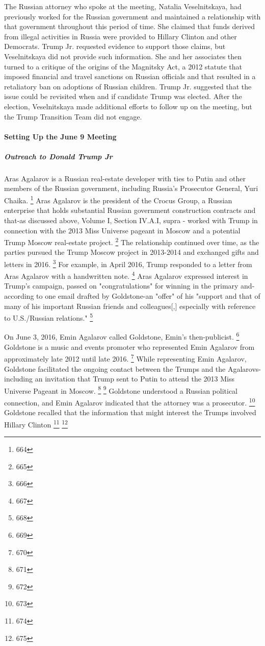 The Russian attorney who spoke at the meeting, Natalia Veselnitskaya, had previously worked for the Russian government and maintained a relationship with that government throughout this period of time.
She claimed that funds derived from illegal activities in Russia were provided to Hillary Clinton and other Democrats.
Trump Jr. requested evidence to support those claims, but Veselnitskaya did not provide such information.
She and her associates then turned to a critique of the origins of the Magnitsky Act, a 2012 statute that imposed financial and travel sanctions on Russian officials and that resulted in a retaliatory ban on adoptions of Russian children.
Trump Jr. suggested that the issue could be revisited when and if candidate Trump was elected.
After the election, Veselnitskaya made additional efforts to follow up on the meeting, but the Trump Transition Team did not engage.

\paragraph{Setting Up the June 9 Meeting}

\subparagraph{Outreach to Donald Trump Jr}

Aras Agalarov is a Russian real-estate developer with ties to Putin and other members of the Russian government, including Russia's Prosecutor General, Yuri Chaika.%
\footnote{664}
Aras Agalarov is the president of the Crocus Group, a Russian enterprise that holds substantial Russian government construction contracts and that-as discussed above, Volume I, Section IV.A.I, supra - worked with Trump in connection with the 2013 Miss Universe pageant in Moscow and a potential Trump Moscow real-estate project.%
\footnote{665}
The relationship continued over time, as the parties pursued the Trump Moscow project in 2013-2014 and exchanged gifts and letters in 2016.%
\footnote{666}
For example, in April 2016, Trump responded to a letter from Aras Agalarov with a handwritten note.%
\footnote{667}
Aras Agalarov expressed interest in Trump's campaign, passed on "congratulations" for winning in the primary and-according to one email drafted by Goldstone-an "offer" of his "support and that of many of his important Russian friends and colleagues[,] especially with reference to U.S./Russian relations."%
\footnote{668}

On June 3, 2016, Emin Agalarov called Goldstone, Emin's then-publicist.%
\footnote{669}
Goldstone is a music and events promoter who represented Emin Agalarov from approximately late 2012 until late 2016.%
\footnote{670}
While representing Emin Agalarov, Goldstone facilitated the ongoing contact between the Trumps and the Agalarovs-including an invitation that Trump sent to Putin to attend the 2013 Miss Universe Pageant in Moscow.%
\footnote{671}
\footnote{672}
Goldstone understood
a Russian political connection, and Emin Agalarov indicated that the attorney was a prosecutor.%
\footnote{673}
Goldstone recalled that the information that might interest the Trumps involved Hillary Clinton
\footnote{674}
\footnote{675}

